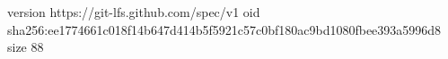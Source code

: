 version https://git-lfs.github.com/spec/v1
oid sha256:ee1774661c018f14b647d414b5f5921c57c0bf180ac9bd1080fbee393a5996d8
size 88
